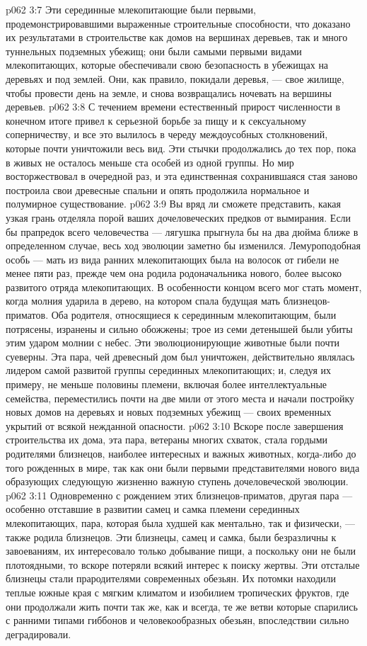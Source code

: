 \vs p062 3:7 Эти серединные млекопитающие были первыми, продемонстрировавшими выраженные строительные способности, что доказано их результатами в строительстве как домов на вершинах деревьев, так и много туннельных подземных убежищ; они были самыми первыми видами млекопитающих, которые обеспечивали свою безопасность в убежищах на деревьях и под землей. Они, как правило, покидали деревья, --- свое жилище, чтобы провести день на земле, и снова возвращались ночевать на вершины деревьев.
\vs p062 3:8 С течением времени естественный прирост численности в конечном итоге привел к серьезной борьбе за пищу и к сексуальному соперничеству, и все это вылилось в череду междоусобных столкновений, которые почти уничтожили весь вид. Эти стычки продолжались до тех пор, пока в живых не осталось меньше ста особей из одной группы. Но мир восторжествовал в очередной раз, и эта единственная сохранившаяся стая заново построила свои древесные спальни и опять продолжила нормальное и полумирное существование.
\vs p062 3:9 \pc Вы вряд ли сможете представить, какая узкая грань отделяла порой ваших дочеловеческих предков от вымирания. Если бы прапредок всего человечества --- лягушка прыгнула бы на два дюйма ближе в определенном случае, весь ход эволюции заметно бы изменился. Лемуроподобная особь --- мать из вида ранних млекопитающих была на волосок от гибели не менее пяти раз, прежде чем она родила родоначальника нового, более высоко развитого отряда млекопитающих. В особенности концом всего мог стать момент, когда молния ударила в дерево, на котором спала будущая мать близнецов\hyp{}приматов. Оба родителя, относящиеся к серединным млекопитающим, были потрясены, изранены и сильно обожжены; трое из семи детенышей были убиты этим ударом молнии с небес. Эти эволюционирующие животные были почти суеверны. Эта пара, чей древесный дом был уничтожен, действительно являлась лидером самой развитой группы серединных млекопитающих; и, следуя их примеру, не меньше половины племени, включая более интеллектуальные семейства, переместились почти на две мили от этого места и начали постройку новых домов на деревьях и новых подземных убежищ --- своих временных укрытий от всякой нежданной опасности.
\vs p062 3:10 Вскоре после завершения строительства их дома, эта пара, ветераны многих схваток, стала гордыми родителями близнецов, наиболее интересных и важных животных, когда\hyp{}либо до того рожденных в мире, так как они были первыми представителями нового вида  образующих следующую жизненно важную ступень дочеловеческой эволюции.
\vs p062 3:11 \pc Одновременно с рождением этих близнецов\hyp{}приматов, другая пара --- особенно отставшие в развитии самец и самка племени серединных млекопитающих, пара, которая была худшей как ментально, так и физически, --- также родила близнецов. Эти близнецы, самец и самка, были безразличны к завоеваниям, их интересовало только добывание пищи, а поскольку они не были плотоядными, то вскоре потеряли всякий интерес к поиску жертвы. Эти отсталые близнецы стали прародителями современных обезьян. Их потомки находили теплые южные края с мягким климатом и изобилием тропических фруктов, где они продолжали жить почти так же, как и всегда, те же ветви которые спарились с ранними типами гиббонов и человекообразных обезьян, впоследствии сильно деградировали.
